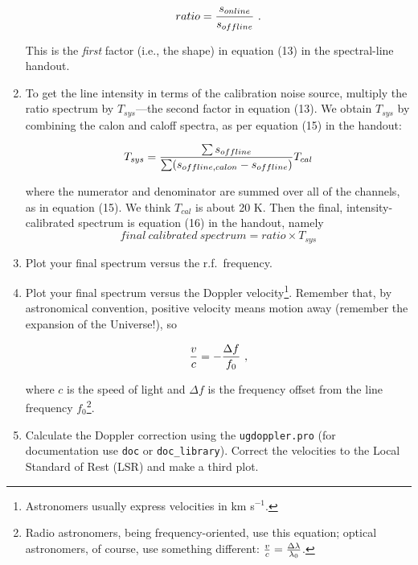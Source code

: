 \documentclass[11pt,preprint]{aastex}
\begin{document}
\begin{enumerate}
\begin{equation}
ratio = {s_{online} \over s_{offline}} \ .
\end{equation}

\noindent This is the {\it first} factor (i.e., the shape) in equation
(13) in the spectral-line handout.

\item To get the line intensity in terms of the calibration noise
  source, multiply the ratio spectrum by $T_{sys}$---the second factor
  in equation (13). We obtain $T_{sys}$ by combining the calon and
  caloff spectra, as per equation (15) in the handout:

\begin{equation}
T_{sys} = {\sum s_{offline} \over \sum(s_{offline, calon} - s_{offline})} T_{cal}
\end{equation}

\noindent where the numerator and denominator are summed over all of the
channels, as in equation (15). We think $T_{cal}$ is about 20 K.  Then
the final, intensity-calibrated spectrum is equation (16) in the
handout, namely
\begin{equation}
final \ calibrated \ spectrum = ratio \times T_{sys}
\end{equation}

\item Plot your final spectrum versus the r.f.\ frequency.

\item Plot your final spectrum versus the Doppler
  velocity\footnote{Astronomers usually express velocities in km s$^{-1}$.}.
Remember that, by astronomical convention, positive velocity means
motion away (remember the expansion of the Universe!), so

\begin{equation}
{v \over c} = -{\Delta f \over f_0} \ ,
\end{equation}

\noindent where $c$ is the speed of light and $\Delta f$ is the frequency
offset from the line frequency $f_0$\footnote{Radio astronomers, being
  frequency-oriented, use this equation; optical astronomers, of course,
  use something different: ${v \over c} = {\Delta \lambda \over
    \lambda_0}$.}. 

\item Calculate the Doppler correction using the {\tt ugdoppler.pro}
(for documentation use {\tt doc} or {\tt doc\_library}). Correct the
velocities to the Local Standard of Rest (LSR) and make a third plot.


\end{enumerate}
\end{document}
